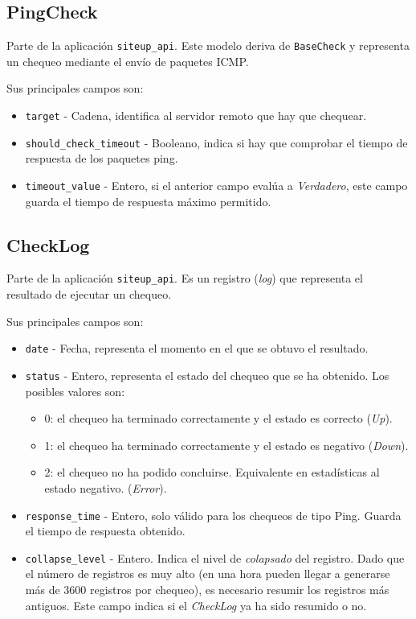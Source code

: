 \subsection{PingCheck}

Parte de la aplicación \texttt{siteup\_api}. Este modelo deriva de
\texttt{BaseCheck} y representa un chequeo mediante el envío de paquetes \ac{ICMP}.

Sus principales campos son:

\begin{itemize}
\item \texttt{target} - Cadena, identifica al servidor remoto que hay que chequear.
\item \texttt{should\_check\_timeout} - Booleano, indica si hay que comprobar el tiempo de respuesta de los paquetes ping.
\item \texttt{timeout\_value} - Entero, si el anterior campo evalúa a
  \textit{Verdadero}, este campo guarda el tiempo de respuesta máximo permitido.
\end{itemize}

\subsection{CheckLog}

Parte de la aplicación \texttt{siteup\_api}. Es un registro (\textit{log}) que
representa el resultado de ejecutar un chequeo.

Sus principales campos son:

\begin{itemize}
\item \texttt{date} - Fecha, representa el momento en el que se obtuvo el resultado.
\item \texttt{status} - Entero, representa el estado del chequeo que se ha
  obtenido. Los posibles valores son:
  \begin{itemize}
  \item 0: el chequeo ha terminado correctamente y el estado es correcto (\textit{Up}).
  \item 1: el chequeo ha terminado correctamente y el estado es negativo (\textit{Down}).
  \item 2: el chequeo no ha podido concluirse. Equivalente en estadísticas al estado negativo. (\textit{Error}).
  \end{itemize}
\item \texttt{response\_time} - Entero, solo válido para los chequeos de tipo
  Ping. Guarda el tiempo de respuesta obtenido.
\item \texttt{collapse\_level} - Entero. Indica el nivel de \textit{colapsado}
  del registro. Dado que el número de registros es muy alto (en una hora pueden
  llegar a generarse más de 3600 registros por chequeo), es necesario resumir
  los registros más antiguos. Este campo indica si el \textit{CheckLog} ya ha
  sido resumido o no.
\end{itemize}

